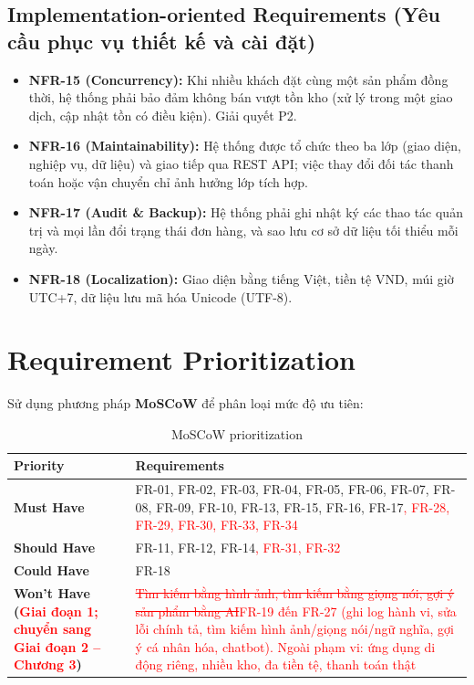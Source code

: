 \documentclass[12pt,a4paper,oneside]{report}
\newif\ifmark \marktrue
\newcommand{\chg}[1]{\ifmark\textcolor{red}{#1}\else #1\fi}
\newcommand{\del}[1]{\ifmark\textcolor{red}{\sout{#1}}\fi}
\newenvironment{chgblock}{\ifmark\color{red}\fi}{}
\begin{document}
\begin{chgblock}
\subsection{Implementation-oriented Requirements (Yêu cầu phục vụ thiết kế và cài đặt)}

\begin{itemize}
  \item \textbf{NFR-15 (Concurrency):} Khi nhiều khách đặt cùng một sản phẩm đồng thời, hệ thống phải bảo đảm không bán vượt tồn kho (xử lý trong một giao dịch, cập nhật tồn có điều kiện). Giải quyết P2.
  \item \textbf{NFR-16 (Maintainability):} Hệ thống được tổ chức theo ba lớp (giao diện, nghiệp vụ, dữ liệu) và giao tiếp qua REST API; việc thay đổi đối tác thanh toán hoặc vận chuyển chỉ ảnh hưởng lớp tích hợp.
  \item \textbf{NFR-17 (Audit \& Backup):} Hệ thống phải ghi nhật ký các thao tác quản trị và mọi lần đổi trạng thái đơn hàng, và sao lưu cơ sở dữ liệu tối thiểu mỗi ngày.
  \item \textbf{NFR-18 (Localization):} Giao diện bằng tiếng Việt, tiền tệ VND, múi giờ UTC+7, dữ liệu lưu mã hóa Unicode (UTF-8).
\end{itemize}
\end{chgblock}

\section{Requirement Prioritization}

Sử dụng phương pháp \textbf{MoSCoW} để phân loại mức độ ưu tiên:

\begin{longtable}{p{4.2cm}p{11.8cm}}
\caption{MoSCoW prioritization}\\
\toprule
\textbf{Priority} & \textbf{Requirements} \\
\midrule
\endhead
\bottomrule
\endlastfoot
\textbf{Must Have} & FR-01, FR-02, FR-03, FR-04, FR-05, FR-06, FR-07, FR-08, FR-09, FR-10, FR-13, FR-15, FR-16, FR-17\chg{, FR-28, FR-29, FR-30, FR-33, FR-34} \\
\textbf{Should Have} & FR-11, FR-12, FR-14\chg{, FR-31, FR-32} \\
\textbf{Could Have} & FR-18 \\
\textbf{Won't Have (\chg{Giai đoạn 1; chuyển sang Giai đoạn 2 -- Chương 3})} & \del{Tìm kiếm bằng hình ảnh, tìm kiếm bằng giọng nói, gợi ý sản phẩm bằng AI}\chg{FR-19 đến FR-27 (ghi log hành vi, sửa lỗi chính tả, tìm kiếm hình ảnh/giọng nói/ngữ nghĩa, gợi ý cá nhân hóa, chatbot). Ngoài phạm vi: ứng dụng di động riêng, nhiều kho, đa tiền tệ, thanh toán thật} \\
\end{longtable}
\end{document}
